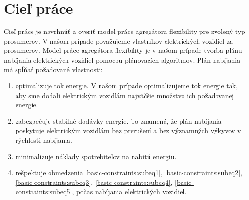 






















\chapter{Cieľ práce}

Cieľ práce je navrhnúť a overiť model práce agregátora flexibility pre zvolený typ prosumerov. V našom prípade považujeme vlastníkov elektrických vozidiel za prosumerov. Model práce agregátora flexibility je v našom prípade tvorba plánu nabíjania elektrických vozidiel pomocou plánovacích algoritmov. Plán nabíjania má spĺňať požadované vlastnosti:


\begin{enumerate}
    \item optimalizuje tok energie. V našom prípade optimalizujeme tok energie tak, aby sme dodali elektrickým vozidlám najväčšie množstvo ich požadovanej energie.
    \item zabezpečuje stabilné dodávky energie. To znamená, že plán nabíjania poskytuje elektrickým vozidlám bez prerušení a bez významných výkyvov v rýchlosti nabíjania.
    \item minimalizuje náklady spotrebiteľov na nabitú energiu. 
    \item rešpektuje obmedzenia \eqref{basic-constraints:subeq1}, \eqref{basic-constraints:subeq2}, \eqref{basic-constraints:subeq3}, \eqref{basic-constraints:subeq4}, \eqref{basic-constraints:subeq5},  počas nabíjania elektrických vozidiel.
\end{enumerate}


